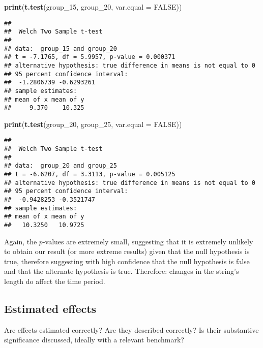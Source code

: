 \documentclass[
]{article}
\newenvironment{Shaded}{\begin{snugshade}}{\end{snugshade}}
\newcommand{\AttributeTok}[1]{\textcolor[rgb]{0.13,0.29,0.53}{#1}}
\newcommand{\ConstantTok}[1]{\textcolor[rgb]{0.56,0.35,0.01}{#1}}
\newcommand{\FunctionTok}[1]{\textcolor[rgb]{0.13,0.29,0.53}{\textbf{#1}}}
\newcommand{\NormalTok}[1]{#1}
\begin{document}
\begin{Shaded}
\begin{Highlighting}[]
\FunctionTok{print}\NormalTok{(}\FunctionTok{t.test}\NormalTok{(group\_15, group\_20, }\AttributeTok{var.equal =} \ConstantTok{FALSE}\NormalTok{))}
\end{Highlighting}
\end{Shaded}

\begin{verbatim}
## 
##  Welch Two Sample t-test
## 
## data:  group_15 and group_20
## t = -7.1765, df = 5.9957, p-value = 0.000371
## alternative hypothesis: true difference in means is not equal to 0
## 95 percent confidence interval:
##  -1.2806739 -0.6293261
## sample estimates:
## mean of x mean of y 
##     9.370    10.325
\end{verbatim}

\begin{Shaded}
\begin{Highlighting}[]
\FunctionTok{print}\NormalTok{(}\FunctionTok{t.test}\NormalTok{(group\_20, group\_25, }\AttributeTok{var.equal =} \ConstantTok{FALSE}\NormalTok{))}
\end{Highlighting}
\end{Shaded}

\begin{verbatim}
## 
##  Welch Two Sample t-test
## 
## data:  group_20 and group_25
## t = -6.6207, df = 3.3113, p-value = 0.005125
## alternative hypothesis: true difference in means is not equal to 0
## 95 percent confidence interval:
##  -0.9428253 -0.3521747
## sample estimates:
## mean of x mean of y 
##   10.3250   10.9725
\end{verbatim}

Again, the \(p\)-values are extremely small, suggesting that it is
extremely unlikely to obtain our result (or more extreme results) given
that the null hypothesis is true, therefore suggesting with high
confidence that the null hypothesis is false and that the alternate
hypothesis is true. Therefore: changes in the string's length do affect
the time period.

\subsection{Estimated effects}\label{estimated-effects}

Are effects estimated correctly? Are they described correctly? Is their
substantive significance discussed, ideally with a relevant benchmark?
\end{document}
